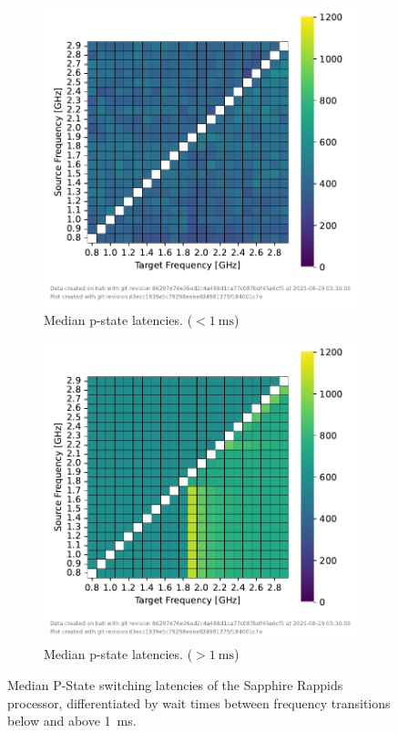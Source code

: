 \begin{figure}[]
    \begin{subfigure}[t]{0.45\linewidth}
        \centering
        \includegraphics[width=\linewidth]{fig/ftalat/ftalat_median_<1ms_hati.pdf}
        \caption{\label{fig:pstate_latencies_median_lt_1ms}Median p-state latencies. ($< \SI{1}{\ms}$)}
    \end{subfigure}
    \hfill
    \begin{subfigure}[t]{0.45\linewidth}
        \centering
        \includegraphics[width=\linewidth]{fig/ftalat/ftalat_median_>1ms_hati.pdf}
        \caption{\label{fig:pstate_latencies_median_gt_1ms}Median p-state latencies. ($> \SI{1}{\ms}$)}
    \end{subfigure}
    \caption{\label{fig:pstate_latencies_median}Median P-State switching latencies of the Sapphire Rappids processor, differentiated by wait times between frequency transitions below and above \SI{1}{\ms}.}
\end{figure}

